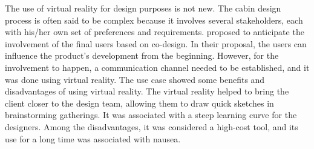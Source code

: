 The use of virtual reality for design purposes is not new. The cabin design process is often said to be complex because it involves several stakeholders, each with his/her own set of preferences and requirements. \cite{moerland2021application} proposed to anticipate the involvement of the final users based on co-design. In their proposal, the users can influence the product's development from the beginning. However, for the involvement to happen, a communication channel needed to be established, and it was done using virtual reality. The use case showed some benefits and disadvantages of using virtual reality. The virtual reality helped to bring the client closer to the design team, allowing them to draw quick sketches in brainstorming gatherings. It was associated with a steep learning curve for the designers. Among the disadvantages, it was considered a high-cost tool, and its use for a long time was associated with nausea.